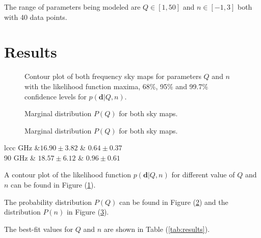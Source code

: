 \documentclass{emulateapj}
\begin{document}
The range of parameters being modeled are $Q \in [1,50]$ and $n \in [-1,3]$ both with 40 data points.





\section{Results}
\label{sec:results}

\begin{figure}[t]
	
	\mbox{}
	
	\caption{Contour plot of both frequency sky maps for parameters $Q$ and $n$ with the likelihood function maxima, 68\%, 95\% and 99.7\% confidence levels for $p(\textbf{d}|Q,n)$. }
	\label{fig:contour}
\end{figure}

\begin{figure}[t]	
	\mbox{}	
	\caption{Marginal distribution $P(Q)$ for both sky maps.}
	\label{fig:PQ}
\end{figure}

\begin{figure}[t]	
	\mbox{}	
	\caption{Marginal distribution $P(Q)$ for both sky maps.}
	\label{fig:Pn}
\end{figure}


\begin{deluxetable}{lccc}
	\tablecaption{\label{tab:results}}
	 GHz &$16.90 \pm 3.82$ & $0.64 \pm  0.37$ \\
	90 GHz & $ 18.57 \pm 6.12$ & $0.96 \pm 0.61$  \\
		\enddata
\end{deluxetable}

A contour plot of the likelihood function $p(\textbf{d}|Q,n)$ for different value of $Q$ and $n$ can be found in Figure (\ref{fig:contour}).

The probability distribution $P(Q)$ can be found in Figure (\ref{fig:PQ}) and the distribution $P(n)$ in Figure (\ref{fig:Pn}).

The best-fit values for $Q$ and $n$ are shown in Table (\ref{tab:results}).
 
\end{document}
